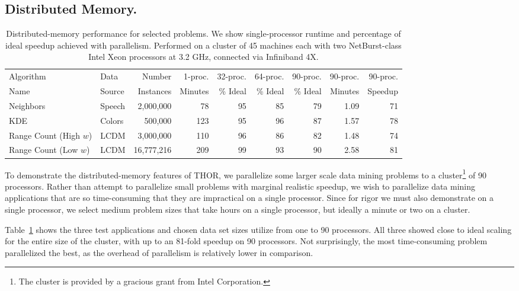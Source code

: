 \documentclass[twoside,leqno,twocolumn]{article}
\newcommand{\tab}[1]{Table~\ref{tab:#1}}
\newcommand{\mysub}[1]{\subsection{#1.}}
\begin{document}
\mysub{Distributed Memory}


\begin{table}
  \centering
  \begin{tabular}{|l|l|r|r||r|r|r||r|r|}
    \hline
    Algorithm               & Data      & Number     & 1-proc. & 32-proc.  & 64-proc.  & 90-proc.  & 90-proc. & 90-proc.
    \\
    Name                    & Source    & Instances  & Minutes & \% Ideal & \% Ideal & \% Ideal & Minutes & Speedup
    \\ \hline \hline
    Neighbors               & Speech    & 2,000,000  & 78  & 95 & 85 & 79 & 1.09 & 71
    \\ \hline
    KDE                     & Colors    & 500,000    & 123 & 95 & 96 & 87 & 1.57 & 78
    \\ \hline
    Range Count (High $w$)  & LCDM      & 3,000,000  & 110 & 96 & 86 & 82 & 1.48 & 74
    \\ \hline
    Range Count (Low $w$)   & LCDM      & 16,777,216 & 209 & 99 & 93 & 90 & 2.58 & 81
    \\ \hline
  \end{tabular}
  \caption{
  \label{tab:distributed}
  Distributed-memory performance for selected problems.
  We show single-processor runtime and percentage of ideal speedup achieved with parallelism.
  Performed on a cluster of 45 machines each with two NetBurst-class Intel Xeon processors at 3.2 GHz, connected via Infiniband 4X.
  }
\end{table}

To demonstrate the distributed-memory features of THOR, we parallelize some larger scale data mining problems to a cluster\footnote{The cluster is provided by a gracious grant from Intel Corporation.} of 90 processors.
Rather than attempt to parallelize small problems with marginal realistic speedup, we wish to parallelize data mining applications that are so time-consuming that they are impractical on a single processor.
Since for rigor we must also demonstrate on a single processor, we select medium problem sizes that take hours on a single processor, but ideally a minute or two on a cluster.

\tab{distributed} shows the three test applications and chosen data set sizes utilize from one to 90 processors.
All three showed close to ideal scaling for the entire size of the cluster, with up to an 81-fold speedup on 90 processors.
Not surprisingly, the most time-consuming problem parallelized the best, as the overhead of parallelism is relatively lower in comparison.
\end{document}
